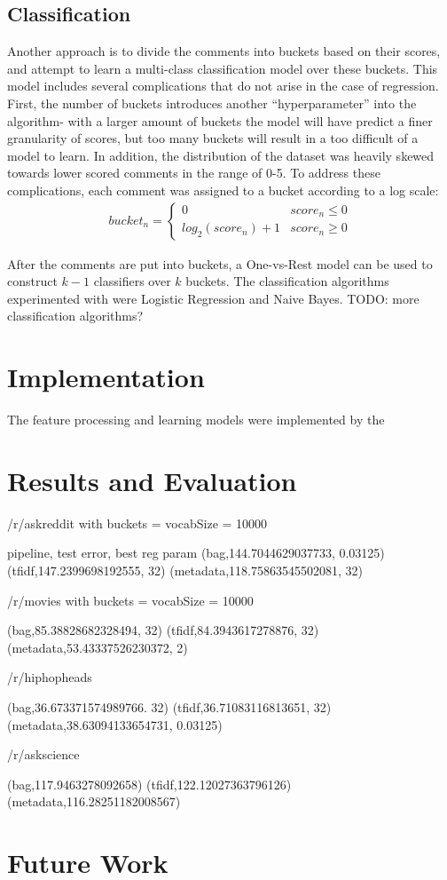 \documentclass[11pt, twocolumn]{article}
\begin{document}
	\subsection{Classification}
	Another approach is to divide the comments into buckets based on their scores, and attempt to learn a multi-class classification model over these buckets. This model includes several complications that do not arise in the case of regression. First, the number of buckets introduces another ``hyperparameter'' into the algorithm- with a larger amount of buckets the model will have predict a finer granularity of scores, but too many buckets will result in a too difficult of a model to learn. In addition, the distribution of the dataset was heavily skewed towards lower scored comments in the range of 0-5. To address these complications, each comment was assigned to a bucket according to a log scale:
	\begin{gather*}
		bucket_n = \begin{cases}
				0 & score_n \le 0 \\
				log_2(score_n) + 1 & score_n \geq 0
				 \end{cases}
	\end{gather*}
	
	After the comments are put into buckets, a One-vs-Rest model can be used to construct $k-1$ classifiers over $k$ buckets. The classification algorithms experimented with were Logistic Regression and Naive Bayes. TODO: more classification algorithms?

\section{Implementation}
	The feature processing and learning models were implemented by the 

\section{Results and Evaluation}

/r/askreddit with buckets = vocabSize = 10000

pipeline, test error, best reg param
(bag,144.7044629037733, 0.03125)
(tfidf,147.2399698192555, 32)
(metadata,118.75863545502081, 32)

/r/movies with buckets = vocabSize = 10000

(bag,85.38828682328494, 32)
(tfidf,84.3943617278876, 32)
(metadata,53.43337526230372, 2)

/r/hiphopheads

(bag,36.673371574989766. 32)
(tfidf,36.71083116813651, 32)
(metadata,38.63094133654731, 0.03125)

/r/askscience

(bag,117.9463278092658)
(tfidf,122.12027363796126)
(metadata,116.28251182008567)


\section{Future Work}





\end{document}
